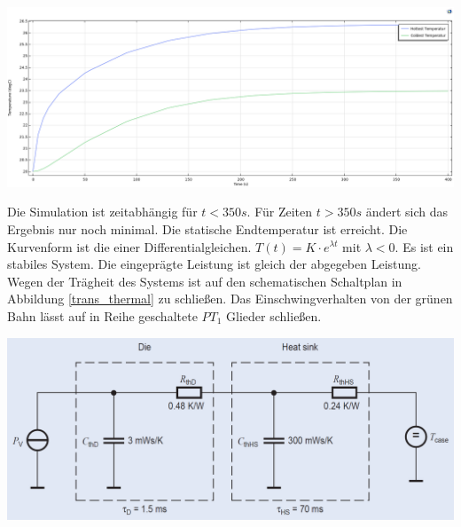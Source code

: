 \documentclass[10pt,a4paper,oneside,abstracton]{scrartcl}
\newenvironment{Figure}
  {\par\medskip\noindent\minipage{\linewidth}}
  {\endminipage\par\medskip}
\begin{document}
\begin{multicols}{2}
\begin{Figure}
	\includegraphics[width=\textwidth]{Bilder/time_dep.png}
	\label{timedep}
\end{Figure}
\noindent
Die Simulation ist zeitabhängig für $ t < 350s $. 
Für Zeiten $ t > 350s $ ändert sich das Ergebnis nur noch minimal. 
Die statische Endtemperatur ist erreicht. 
Die Kurvenform ist die einer Differentialgleichen. $ T(t) = K \cdot e^{\lambda t} $ mit
$ \lambda  < 0$. Es ist ein stabiles System. 
Die eingeprägte Leistung ist gleich der abgegeben Leistung. 
Wegen der Trägheit des Systems ist auf den schematischen Schaltplan in Abbildung \ref{trans_thermal} zu schließen. 
Das Einschwingverhalten von der grünen Bahn lässt auf in Reihe geschaltete $PT_1$ Glieder schließen. 
\begin{Figure}
	\includegraphics[width=\textwidth]{Bilder/trans_thermal.png}
	\label{trans_thermal}
\end{Figure}


\end{multicols}
\end{document}
